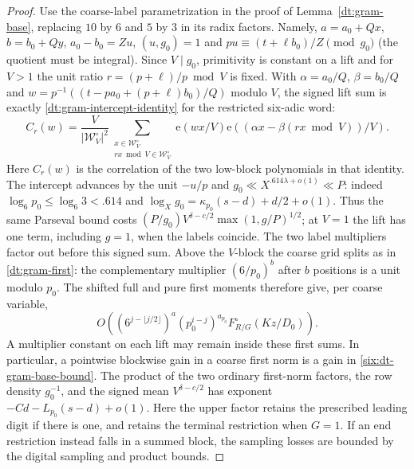 \documentclass[11pt,a4paper]{article}
\theoremstyle{paperplain}
\numberwithin{equation}{section}
\newcommand{\e}{\mathrm e}
\begin{document}
\begin{proof}
Use the coarse-label parametrization in the proof of Lemma~\ref{dt:gram-base},
replacing $10$ by $6$ and $5$ by $3$ in its radix factors. Namely,
$a=a_0+Qx$, $b=b_0+Qy$, $a_0-b_0=Zu$, $(u,g_0)=1$ and
$pu\equiv(t+\ell b_0)/Z\pmod{g_0}$ (the quotient must be integral).
Since $V\mid g_0$, primitivity is constant on a lift and for $V>1$
the unit ratio $r=(p+\ell)/p\bmod V$ is fixed. With
$\alpha=a_0/Q$, $\beta=b_0/Q$ and $w=p^{-1}((t-pa_0+(p+\ell)b_0)/Q)$
modulo $V$, the signed lift sum is exactly \eqref{dt:gram-intercept-identity}
for the restricted six-adic word:
\begin{equation}
 C_r(w)=\frac{V}{|\mathcal W_V^\circ|^2}
  \sum_{\substack{x\in\mathcal W_V^\circ\\rx\bmod V\in\mathcal W_V^\circ}}
              \e(wx/V)\e((\alpha x-\beta(rx\bmod V))/V).
 \label{six:dt-gram-intercept-identity}
\end{equation}
Here $C_r(w)$ is the correlation of the two low-block polynomials in
that identity. The intercept advances by the unit $-u/p$ and
$g_0\ll X^{.614\lambda+o(1)}\ll P$: indeed $\log_6 p_0\le\log_6 3<.614$
and $\log_X g_0=\kappa_{p_0}(s-d)+d/2+o(1)$. Thus the same Parseval
bound costs $(P/g_0)V^{\delta-c/2}\max(1,g/P)^{1/2}$; at $V=1$ the lift
has one term, including $g=1$, when the labels coincide. The two label
multipliers factor out before this signed sum. Above the $V$-block the
coarse grid splits as in \eqref{dt:gram-first}: the complementary
multiplier $(6/p_0)^b$ after $b$ positions is a unit modulo $p_0$.
The shifted full and pure first moments therefore give, per coarse variable,
\begin{equation}
 O\left(
    (6^{j-\lfloor j/2\rfloor})^a
    (p_0^{i-j})^{a_{p_0}}
    F_{R/G}^\circ(Kz/D_0)\right).
 \label{six:dt-gram-first}
\end{equation}
A multiplier constant on each lift may remain inside these
first sums. In particular, a pointwise blockwise gain in a
coarse first norm is a gain in \eqref{six:dt-gram-base-bound}.
The product of the two ordinary first-norm factors, the row
density \(g_0^{-1}\), and the signed mean \(V^{\delta-c/2}\)
has exponent \(-Cd-L_{p_0}(s-d)+o(1)\).
Here the upper factor retains the prescribed leading digit
if there is one, and retains the terminal restriction when
\(G=1\). If an end restriction instead falls in a summed
block, the sampling losses are bounded by
the digital sampling and product bounds.


\end{proof}
\end{document}
